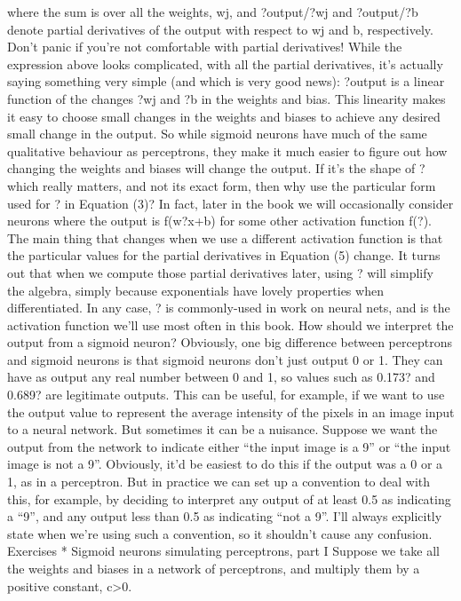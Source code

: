 where the sum is over all the weights, wj, and ?output/?wj and ?output/?b denote partial derivatives of the output with respect to wj and b, respectively. Don't panic if you're not comfortable with partial derivatives! While the expression above looks complicated, with all the partial derivatives, it's actually saying something very simple (and which is very good news):  ?output is a linear function of the changes ?wj and ?b in the weights and bias. This linearity makes it easy to choose small changes in the weights and biases to achieve any desired small change in the output. So while sigmoid neurons have much of the same qualitative behaviour as perceptrons, they make it much easier to figure out how changing the weights and biases will change the output.
If it's the shape of ? which really matters, and not its exact form, then why use the particular form used for ? in Equation (3)? In fact, later in the book we will occasionally consider neurons where the output is f(w?x+b) for some other activation function f(?). The main thing that changes when we use a different activation function is that the particular values for the partial derivatives in Equation (5) change. It turns out that when we compute those partial derivatives later, using ? will simplify the algebra, simply because exponentials have lovely properties when differentiated. In any case, ? is commonly-used in work on neural nets, and is the activation function we'll use most often in this book.
How should we interpret the output from a sigmoid neuron? Obviously, one big difference between perceptrons and sigmoid neurons is that sigmoid neurons don't just output 0 or 1. They can have as output any real number between 0 and 1, so values such as 0.173? and 0.689? are legitimate outputs. This can be useful, for example, if we want to use the output value to represent the average intensity of the pixels in an image input to a neural network. But sometimes it can be a nuisance. Suppose we want the output from the network to indicate either ``the input image is a 9'' or ``the input image is not a 9''. Obviously, it'd be easiest to do this if the output was a 0 or a 1, as in a perceptron. But in practice we can set up a convention to deal with this, for example, by deciding to interpret any output of at least 0.5 as indicating a ``9'', and any output less than 0.5 as indicating ``not a 9''. I'll always explicitly state when we're using such a convention, so it shouldn't cause any confusion.
Exercises
* Sigmoid neurons simulating perceptrons, part I Suppose we take all the weights and biases in a network of perceptrons, and multiply them by a positive constant, c>0.
